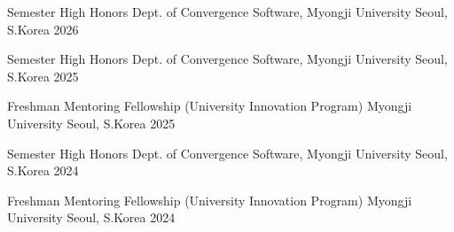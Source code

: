 








\begin{cvhonors}

  \cvhonor
    {Semester High Honors} %
    {Dept. of Convergence Software, Myongji University} %
    {Seoul, S.Korea} %
    {2026} %

  \cvhonor
    {Semester High Honors} %
    {Dept. of Convergence Software, Myongji University} %
    {Seoul, S.Korea} %
    {2025} %


      \cvhonor
    {Freshman Mentoring Fellowship (University Innovation Program)} %
    {Myongji University} %
    {Seoul, S.Korea} %
    {2025} %

  \cvhonor
    {Semester High Honors} %
    {Dept. of Convergence Software, Myongji University} %
    {Seoul, S.Korea} %
    {2024} %
    

  \cvhonor
    {Freshman Mentoring Fellowship (University Innovation Program)} %
    {Myongji University} %
    {Seoul, S.Korea} %
    {2024} %


\end{cvhonors}
